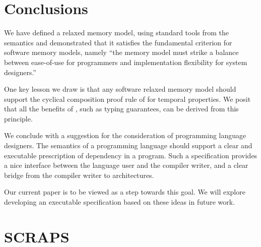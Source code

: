 \section{Conclusions}
We have defined a relaxed memory model, using standard tools from the
semantics and demonstrated that it satisfies the fundamental criterion for
software memory models, namely ``the memory model must strike a balance
between ease-of-use for programmers and implementation flexibility for system
designers.''

One key lesson we draw is that any software relaxed memory model should
support the cyclical composition proof rule of
\citet{Abadi:1993:CS:151646.151649} for temporal properties.  We posit that all
the benefits of \oota, such as typing guarantees, can be derived from this
principle. 

We conclude with a suggestion for the consideration of programming language
designers.  The semantics of a programming language should support a clear
and executable prescription of dependency in a program.  Such a specification
provides a nice interface between the language user and the compiler writer,
and a clear bridge from the compiler writer to architectures.

Our current paper is to be viewed as a step towards this goal.  We will
explore developing an executable specification based on these ideas in future
work.

\section{SCRAPS}

